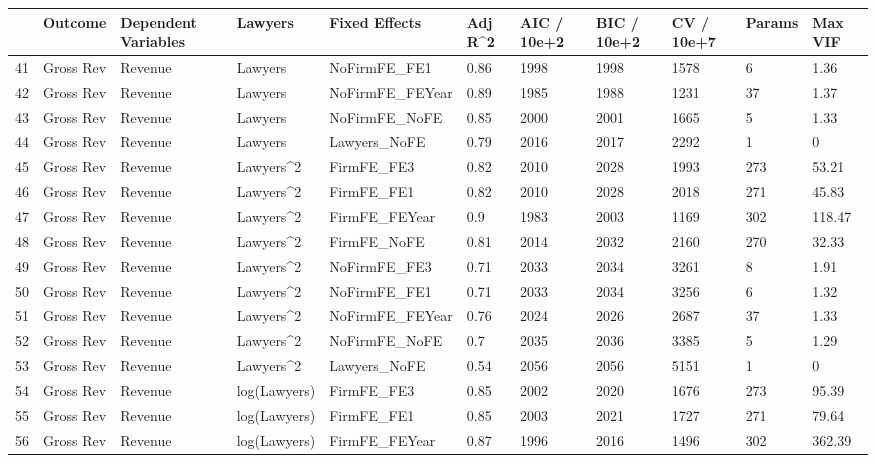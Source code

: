 \begin{table}[ht]
\centering
\begin{tabular}{rllllllllll}
  \hline
 & Outcome & Dependent Variables & Lawyers & Fixed Effects & Adj R^2 & AIC / 10e+2 & BIC / 10e+2 & CV / 10e+7 & Params & Max VIF \\ 
  \hline
41 & Gross Rev & Revenue & Lawyers & NoFirmFE\_FE1 & 0.86 & 1998 & 1998 & 1578 & 6 & 1.36 \\ 
  42 & Gross Rev & Revenue & Lawyers & NoFirmFE\_FEYear & 0.89 & 1985 & 1988 & 1231 & 37 & 1.37 \\ 
  43 & Gross Rev & Revenue & Lawyers & NoFirmFE\_NoFE & 0.85 & 2000 & 2001 & 1665 & 5 & 1.33 \\ 
  44 & Gross Rev & Revenue & Lawyers & Lawyers\_NoFE & 0.79 & 2016 & 2017 & 2292 & 1 & 0 \\ 
  45 & Gross Rev & Revenue & Lawyers^2 & FirmFE\_FE3 & 0.82 & 2010 & 2028 & 1993 & 273 & 53.21 \\ 
  46 & Gross Rev & Revenue & Lawyers^2 & FirmFE\_FE1 & 0.82 & 2010 & 2028 & 2018 & 271 & 45.83 \\ 
  47 & Gross Rev & Revenue & Lawyers^2 & FirmFE\_FEYear & 0.9 & 1983 & 2003 & 1169 & 302 & 118.47 \\ 
  48 & Gross Rev & Revenue & Lawyers^2 & FirmFE\_NoFE & 0.81 & 2014 & 2032 & 2160 & 270 & 32.33 \\ 
  49 & Gross Rev & Revenue & Lawyers^2 & NoFirmFE\_FE3 & 0.71 & 2033 & 2034 & 3261 & 8 & 1.91 \\ 
  50 & Gross Rev & Revenue & Lawyers^2 & NoFirmFE\_FE1 & 0.71 & 2033 & 2034 & 3256 & 6 & 1.32 \\ 
  51 & Gross Rev & Revenue & Lawyers^2 & NoFirmFE\_FEYear & 0.76 & 2024 & 2026 & 2687 & 37 & 1.33 \\ 
  52 & Gross Rev & Revenue & Lawyers^2 & NoFirmFE\_NoFE & 0.7 & 2035 & 2036 & 3385 & 5 & 1.29 \\ 
  53 & Gross Rev & Revenue & Lawyers^2 & Lawyers\_NoFE & 0.54 & 2056 & 2056 & 5151 & 1 & 0 \\ 
  54 & Gross Rev & Revenue & log(Lawyers) & FirmFE\_FE3 & 0.85 & 2002 & 2020 & 1676 & 273 & 95.39 \\ 
  55 & Gross Rev & Revenue & log(Lawyers) & FirmFE\_FE1 & 0.85 & 2003 & 2021 & 1727 & 271 & 79.64 \\ 
  56 & Gross Rev & Revenue & log(Lawyers) & FirmFE\_FEYear & 0.87 & 1996 & 2016 & 1496 & 302 & 362.39 \\ 

\end{tabular}
\end{table}
